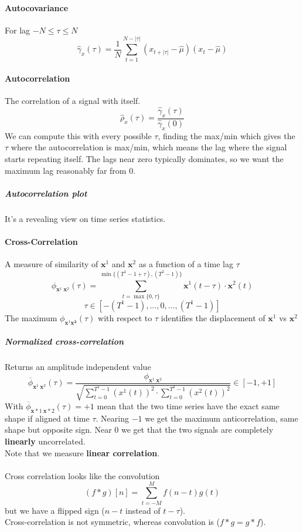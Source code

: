 \documentclass[10pt]{report}
\begin{document}
\paragraph{Autocovariance} For lag $-N\leq \tau \leq N$
$$\hat\gamma_x(\tau) = \frac{1}{N}\sum_{t=1}^{N-|\tau|} (x_{t+|\tau|}-\hat\mu)(x_t - \hat\mu)$$
\paragraph{Autocorrelation} The correlation of a signal with itself. $$\hat\rho_x(\tau)=\frac{\hat\gamma_x(\tau)}{\hat\gamma_x(0)}$$
We can compute this with every possible $\tau$, finding the max/min which gives the $\tau$ where the autocorrelation is max/min, which means the lag where the signal starts repeating itself. The lags near zero typically dominates, so we want the maximum lag reasonably far from 0.
\subparagraph{Autocorrelation plot} It's a revealing view on time series statistics.
\paragraph{Cross-Correlation} A measure of similarity of $\mathbf{x}^1$ and $\mathbf{x}^2$ as a function of a time lag $\tau$ $$\phi_{\mathbf{x}^1\:\mathbf{x}^2}(\tau)=\sum_{t = \max\{0,\tau\}}^{\min\{(T^1 - 1 + \tau), (T^2 - 1)\}} \mathbf{x}^1(t-\tau)\cdot \mathbf{x}^2(t)$$
$$\tau\in[-(T^1-1),\ldots,0,\ldots,(T^1-1)]$$
The maximum $\phi_{\mathbf{x}^1\mathbf{x^2}}(\tau)$ with respect to $\tau$ identifies the displacement of $\mathbf{x}^1$ vs $\mathbf{x}^2$
\subparagraph{Normalized cross-correlation} Returns an amplitude independent value
$$\overline{\phi}_{\mathbf{x}^1\:\mathbf{x}^2}(\tau) = \frac{\phi_{\mathbf{x}^1\:\mathbf{x}^2}}{\sqrt{\sum_{t=0}^{T^1-1}(x^1(t))^2\cdot\sum_{t=0}^{T^2-1}(x^2(t))^2}} \in [-1,+1]$$
With $\overline{\phi}_{\mathbf{x}*1\:\mathbf{x}*2}(\tau) = +1$ mean that the two time series have the exact same shape if aligned at time $\tau$. Nearing $-1$ we get the maximum anticorrelation, same shape but opposite sign. Near 0 we get that the two signals are completely \textbf{linearly} uncorrelated.\\
Note that we measure \textbf{linear correlation}.\\\\
Cross correlation looks like the convolution $$(f * g)[n]=\sum_{t=-M}^M f(n-t)g(t)$$ but we have a flipped sign ($n-t$ instead of $t-\tau$).\\
Cross-correlation is not symmetric, whereas convolution is ($f * g = g * f$).
\end{document}
